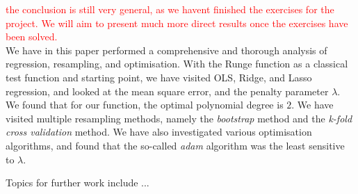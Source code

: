 \textcolor{red}{the conclusion is still very general, as we havent finished the exercises for the project. We will aim  to present much more direct results once the exercises have been solved.}\\

We have in this paper performed a comprehensive and thorough analysis of regression, resampling, and optimisation. With the Runge function as a classical test function and starting point, we have visited OLS, Ridge, and Lasso regression, and looked at the mean square error, and the penalty parameter $\lambda$. We found that for our function, the optimal polynomial degree is $2$. We have visited multiple resampling methods, namely the \textit{bootstrap} method and the \textit{k-fold cross validation} method. We have also investigated various optimisation algorithms, and found that the so-called \textit{adam} algorithm was the least sensitive to $\lambda$.  

Topics for further work include ...
